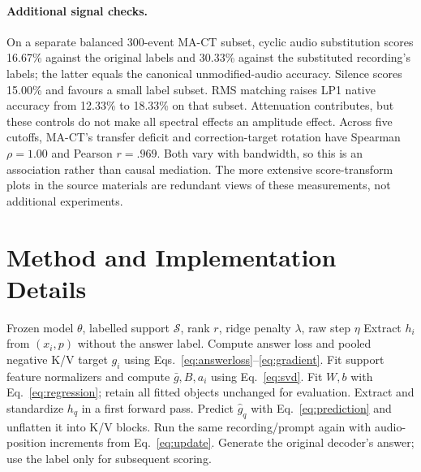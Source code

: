 \documentclass{article}
\newcommand{\method}{AKR}
\newcommand{\Sset}{\mathcal S}
\begin{document}
\paragraph{Additional signal checks.}
On a separate balanced 300-event MA-CT subset, cyclic audio substitution scores 16.67\% against the original labels and 30.33\% against the substituted recording's labels; the latter equals the canonical unmodified-audio accuracy. Silence scores 15.00\% and favours a small label subset. RMS matching raises LP1 native accuracy from 12.33\% to 18.33\% on that subset. Attenuation contributes, but these controls do not make all spectral effects an amplitude effect. Across five cutoffs, MA-CT's transfer deficit and correction-target rotation have Spearman $\rho=1.00$ and Pearson $r=.969$. Both vary with bandwidth, so this is an association rather than causal mediation. The more extensive score-transform plots in the source materials are redundant views of these measurements, not additional experiments.

\clearpage
\section{Method and Implementation Details}
\label{app:math}
\begin{algorithm}[htbp]
\caption{\method: support fitting and label-free query inference}
\label{alg:akr}
\begin{algorithmic}[1]
\Require Frozen model $\theta$, labelled support $\Sset$, rank $r$, ridge penalty $\lambda$, raw step $\eta$
\For{each $(x_i,y_i)\in\Sset$}
\State Extract $h_i$ from $(x_i,p)$ without the answer label.
\State Compute answer loss and pooled negative K/V target $g_i$ using Eqs.~\ref{eq:answerloss}--\ref{eq:gradient}.
\EndFor
\State Fit support feature normalizers and compute $\bar g,B,a_i$ using Eq.~\ref{eq:svd}.
\State Fit $W,b$ with Eq.~\ref{eq:regression}; retain all fitted objects unchanged for evaluation.
\State Extract and standardize $h_q$ in a first forward pass.
\State Predict $\widehat g_q$ with Eq.~\ref{eq:prediction} and unflatten it into K/V blocks.
\State Run the same recording/prompt again with audio-position increments from Eq.~\ref{eq:update}.
\State Generate the original decoder's answer; use the label only for subsequent scoring.
\EndFor
\end{algorithmic}
\end{algorithm}
\end{document}
